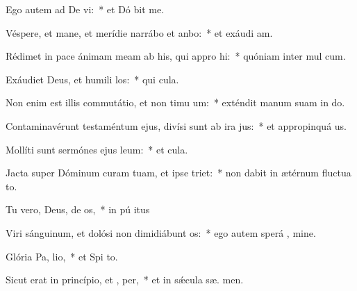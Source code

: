 \item Ego autem ad De vi:~* et Dó bit me.
\item Véspere, et mane, et merídie narrábo et anbo:~* et exáudi  am.
\item Rédimet in pace ánimam meam ab his, qui appro hi:~* quóniam inter mul  cum.
\item Exáudiet Deus, et humili los:~* qui   cula.
\item Non enim est illis commutátio, et non timu um:~* exténdit manum suam in do.
\item Contaminavérunt testaméntum ejus, divísi sunt ab ira  jus:~* et appropinquá  us.
\item Mollíti sunt sermónes ejus  leum:~* et   cula.
\item Jacta super Dóminum curam tuam, et ipse  triet:~* non dabit in ætérnum fluctua to.
\item Tu vero, Deus, de os,~* in pú itus
\item Viri sánguinum, et dolósi non dimidiábunt  os:~* ego autem sperá  , mine.
\item Glória Pa,  lio,~* et Spi to.
\item Sicut erat in princípio, et ,  per,~* et in sǽcula sæ. men.
